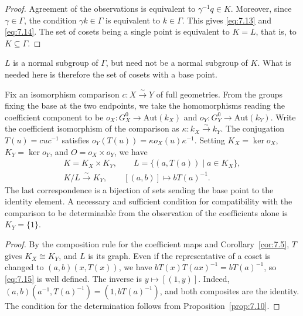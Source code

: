 \begin{proof}

Agreement of the observations is equivalent to $\gamma^{-1}q\in K$.
Moreover, since $\gamma\in\Gamma$, the condition $\gamma k\in\Gamma$ is equivalent to
$k\in\Gamma$.
This gives \eqref{eq:7.13} and \eqref{eq:7.14}.
The set of cosets being a single point is equivalent to $K=L$, that is, to
$K\subseteq\Gamma$.

\end{proof}

$L$ is a normal subgroup of $\Gamma$, but need not be a normal subgroup of $K$.
What is needed here is therefore the set of cosets with a base point.

\begin{corollary}\label{cor:7.11}

Fix an isomorphism comparison $c:X\xrightarrow{\sim}Y$ of full geometries.
From the groups fixing the base at the two endpoints, we take the homomorphisms reading the
coefficient component to be
$o_X:G_X^0\to\mathrm{Aut}(k_X)$ and $o_Y:G_Y^0\to\mathrm{Aut}(k_Y)$.
Write the coefficient isomorphism of the comparison as $\kappa:k_X\xrightarrow{\sim}k_Y$.
The conjugation $T(u)=cuc^{-1}$ satisfies
$o_Y(T(u))=\kappa o_X(u)\kappa^{-1}$.
Setting $K_X=\ker o_X$, $K_Y=\ker o_Y$, and $O=o_X\times o_Y$, we have
\begin{equation*}
\begin{gathered}
K=K_X\times K_Y,\qquad L=\{(a,T(a))\mid a\in K_X\},\\
K/L\xrightarrow{\sim}K_Y,\qquad [(a,b)]\longmapsto bT(a)^{-1}.
\end{gathered}
\tag{7.15}\label{eq:7.15}
\end{equation*}
The last correspondence is a bijection of sets sending the base point to the identity
element.
A necessary and sufficient condition for compatibility with the comparison to be
determinable from the observation of the coefficients alone is $K_Y=\{1\}$.

\end{corollary}

\begin{proof}

By the composition rule for the coefficient maps and Corollary~\ref{cor:7.5}, $T$ gives
$K_X\cong K_Y$, and $L$ is its graph.
Even if the representative of a coset is changed to $(a,b)(x,T(x))$, we have
$bT(x)T(ax)^{-1}=bT(a)^{-1}$, so \eqref{eq:7.15} is well defined.
The inverse is $y\mapsto[(1,y)]$.
Indeed, $(a,b)(a^{-1},T(a)^{-1})=(1,bT(a)^{-1})$, and both composites are the identity.
The condition for the determination follows from Proposition~\ref{prop:7.10}.

\end{proof}

